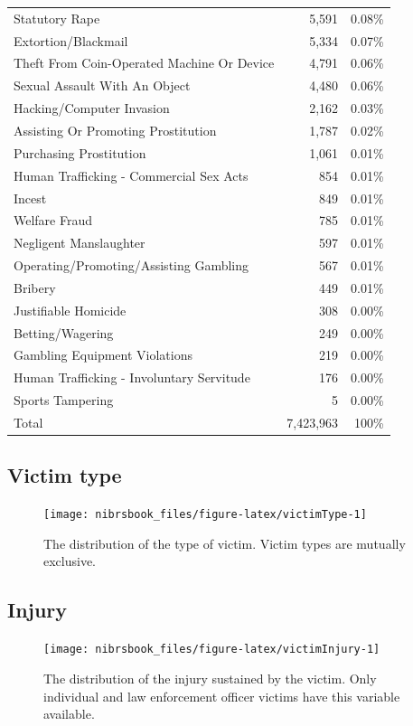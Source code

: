 \documentclass[
  12pt,
  openany]{book}
\begin{document}
\begin{longtable}[]{@{}lrr@{}}
Statutory Rape & 5,591 & 0.08\%\tabularnewline
Extortion/Blackmail & 5,334 & 0.07\%\tabularnewline
Theft From Coin-Operated Machine Or Device & 4,791 & 0.06\%\tabularnewline
Sexual Assault With An Object & 4,480 & 0.06\%\tabularnewline
Hacking/Computer Invasion & 2,162 & 0.03\%\tabularnewline
Assisting Or Promoting Prostitution & 1,787 & 0.02\%\tabularnewline
Purchasing Prostitution & 1,061 & 0.01\%\tabularnewline
Human Trafficking - Commercial Sex Acts & 854 & 0.01\%\tabularnewline
Incest & 849 & 0.01\%\tabularnewline
Welfare Fraud & 785 & 0.01\%\tabularnewline
Negligent Manslaughter & 597 & 0.01\%\tabularnewline
Operating/Promoting/Assisting Gambling & 567 & 0.01\%\tabularnewline
Bribery & 449 & 0.01\%\tabularnewline
Justifiable Homicide & 308 & 0.00\%\tabularnewline
Betting/Wagering & 249 & 0.00\%\tabularnewline
Gambling Equipment Violations & 219 & 0.00\%\tabularnewline
Human Trafficking - Involuntary Servitude & 176 & 0.00\%\tabularnewline
Sports Tampering & 5 & 0.00\%\tabularnewline
Total & 7,423,963 & 100\%\tabularnewline
\bottomrule
\end{longtable}

\hypertarget{victim-type}{%
\subsection{Victim type}\label{victim-type}}

\begin{figure}

{\centering \texttt{[image: nibrsbook\_files/figure-latex/victimType-1]} 

}

\caption{The distribution of the type of victim. Victim types are mutually exclusive.}\label{fig:victimType}
\end{figure}

\hypertarget{injury}{%
\subsection{Injury}\label{injury}}

\begin{figure}

{\centering \texttt{[image: nibrsbook\_files/figure-latex/victimInjury-1]} 

}

\caption{The distribution of the injury sustained by the victim. Only individual and law enforcement officer victims have this variable available.}\label{fig:victimInjury}
\end{figure}
\end{document}
